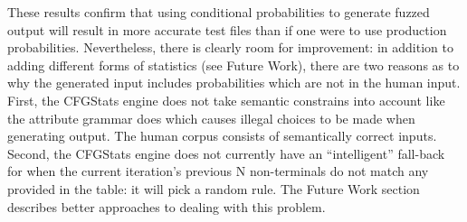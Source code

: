 These results confirm that using conditional probabilities to generate fuzzed
output will result in more accurate test files than if one were to use
production probabilities. Nevertheless, there is clearly room for improvement:
in addition to adding different forms of statistics (see Future Work), there
are two reasons as to why the generated input includes probabilities which are
not in the human input. First, the CFGStats engine does not take semantic
constrains into account like the attribute grammar does which causes illegal
choices to be made when generating output. The human corpus consists of
semantically correct inputs. Second, the CFGStats engine does not currently
have an ``intelligent'' fall-back for when the current iteration's previous N
non-terminals do not match any provided in the table: it will pick a random
rule. The Future Work section describes better approaches to dealing with this
problem.
















